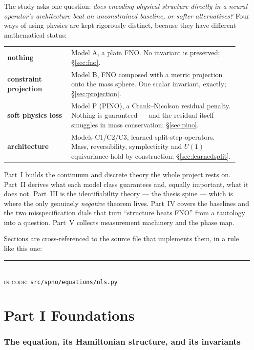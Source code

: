 \documentclass[11pt,a4paper]{article}
\theoremstyle{plain}
\theoremstyle{definition}
\theoremstyle{remark}
\newcommand{\src}[1]{{\color{linknavy}\texttt{\footnotesize #1}}}
\newcommand{\sourcenote}[1]{%
  \par\vspace{0.35em}\noindent
  {\footnotesize\color{rulegray}\rule{\linewidth}{0.4pt}\\[0.25em]
  \textsc{in code:} \src{#1}}\par\vspace{0.5em}}
\begin{document}
The study asks one question: \emph{does encoding physical structure directly in a neural
operator's architecture beat an unconstrained baseline, or softer alternatives?} Four
ways of using physics are kept rigorously distinct, because they have different
mathematical status:

\begin{center}
\begin{tabular}{@{}p{0.26\linewidth}p{0.68\linewidth}@{}}
\toprule
\textbf{nothing} & Model A, a plain FNO. No invariant is preserved; \S\ref{sec:fno}.\\
\textbf{constraint projection} & Model B, FNO composed with a metric projection onto the
mass sphere. One scalar invariant, exactly; \S\ref{sec:projection}.\\
\textbf{soft physics loss} & Model P (PINO), a Crank--Nicolson residual penalty. Nothing
is guaranteed --- and the residual itself smuggles in mass conservation;
\S\ref{sec:pino}.\\
\textbf{architecture} & Models C1/C2/C3, learned split-step operators. Mass,
reversibility, symplecticity and $U(1)$ equivariance hold by construction;
\S\ref{sec:learnedsplit}.\\
\bottomrule
\end{tabular}
\end{center}

Part~I builds the continuum and discrete theory the whole project rests on. Part~II
derives what each model class guarantees and, equally important, what it does not.
Part~III is the identifiability theory --- the thesis spine --- which is where the only
genuinely \emph{negative} theorem lives. Part~IV covers the baselines and the two
misspecification dials that turn ``structure beats FNO'' from a tautology into a
question. Part~V collects measurement machinery and the phase map.

Sections are cross-referenced to the source file that implements them, in a rule like
this one:

\sourcenote{src/spno/equations/nls.py}

\newpage
\part*{Part I \quad Foundations}
\section{The equation, its Hamiltonian structure, and its invariants}
\label{sec:equation}
\end{document}
